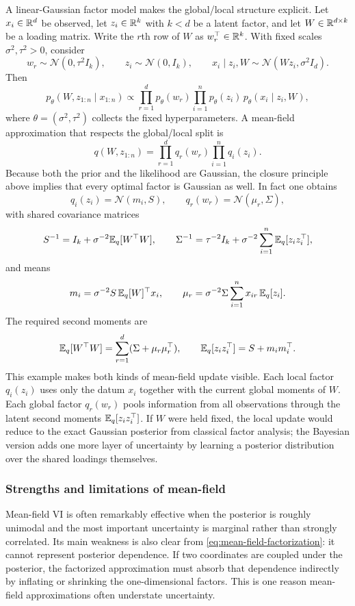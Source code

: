 \begin{example}
\label{ex:mfvi-bfa}
A linear-Gaussian factor model makes the global/local structure explicit.
Let \(x_i\in\mathbb{R}^d\) be observed, let \(z_i\in\mathbb{R}^k\) with \(k<d\) be a latent factor, and let \(W\in\mathbb{R}^{d\times k}\) be a loading matrix.
Write the \(r\)th row of \(W\) as \(w_r^\top\in\mathbb{R}^k\).
With fixed scales \(\sigma^2,\tau^2>0\), consider
\[
  w_r \sim \mathcal{N}(0,\tau^2 I_k),
  \qquad
  z_i \sim \mathcal{N}(0,I_k),
  \qquad
  x_i\mid z_i,W \sim \mathcal{N}(Wz_i,\sigma^2 I_d).
 \]
Then
\[
  p_\theta(W,z_{1:n}\mid x_{1:n})
  \propto
  \prod_{r=1}^d p_\theta(w_r)
  \prod_{i=1}^n p_\theta(z_i)\,p_\theta(x_i\mid z_i,W),
\]
where \(\theta=(\sigma^2,\tau^2)\) collects the fixed hyperparameters.
A mean-field approximation that respects the global/local split is
\[
  q(W,z_{1:n})
  =
  \prod_{r=1}^d q_r(w_r)\prod_{i=1}^n q_i(z_i).
\]
Because both the prior and the likelihood are Gaussian, the closure principle above implies that every optimal factor is Gaussian as well.
In fact one obtains
\[
  q_i(z_i)
  =
  \mathcal{N}(m_i,S),
  \qquad
  q_r(w_r)
  =
  \mathcal{N}(\mu_r,\Sigma),
\]
with shared covariance matrices
\[
  S^{-1}
  =
  I_k + \sigma^{-2}\mathbb{E}_q[W^\top W],
  \qquad
  \Sigma^{-1}
  =
  \tau^{-2}I_k + \sigma^{-2}\sum_{i=1}^n \mathbb{E}_q[z_i z_i^\top],
\]
and means
\[
  m_i
  =
  \sigma^{-2}S\,\mathbb{E}_q[W]^\top x_i,
  \qquad
  \mu_r
  =
  \sigma^{-2}\Sigma\sum_{i=1}^n x_{ir}\,\mathbb{E}_q[z_i].
\]
The required second moments are
\[
  \mathbb{E}_q[W^\top W]
  =
  \sum_{r=1}^d (\Sigma + \mu_r\mu_r^\top),
  \qquad
  \mathbb{E}_q[z_i z_i^\top]
  =
  S + m_i m_i^\top.
\]
This example makes both kinds of mean-field update visible.
Each local factor \(q_i(z_i)\) uses only the datum \(x_i\) together with the current global moments of \(W\).
Each global factor \(q_r(w_r)\) pools information from all observations through the latent second moments \(\mathbb{E}_q[z_i z_i^\top]\).
If \(W\) were held fixed, the local update would reduce to the exact Gaussian posterior from classical factor analysis; the Bayesian version adds one more layer of uncertainty by learning a posterior distribution over the shared loadings themselves.
\end{example}

\subsubsection{Strengths and limitations of mean-field}
\label{subsubsec:mean-field-strengths-limitations}

Mean-field VI is often remarkably effective when the posterior is roughly unimodal and the most important uncertainty is marginal rather than strongly correlated.
Its main weakness is also clear from \eqref{eq:mean-field-factorization}: it cannot represent posterior dependence.
If two coordinates are coupled under the posterior, the factorized approximation must absorb that dependence indirectly by inflating or shrinking the one-dimensional factors.
This is one reason mean-field approximations often understate uncertainty.

